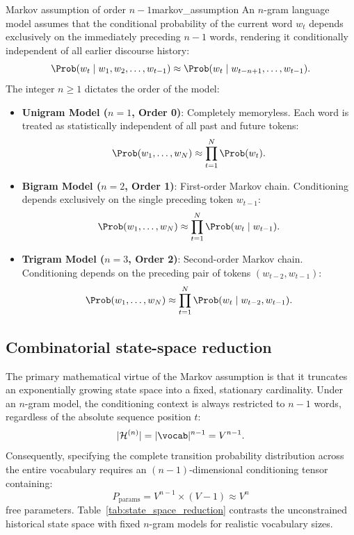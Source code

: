 \documentclass[../../main.tex]{subfiles}
\begin{document}
\begin{definition}{Markov assumption of order $n-1$}{markov_assumption}
An $n$-gram language model assumes that the conditional probability of the current word $w_t$ depends exclusively on the immediately preceding $n-1$ words, rendering it conditionally independent of all earlier discourse history:
\begin{equation}
\label{eq:markov_approx}
\Prob(w_t \mid w_1, w_2, \dots, w_{t-1}) \approx \Prob(w_t \mid w_{t-n+1}, \dots, w_{t-1}).
\end{equation}
The integer $n \ge 1$ dictates the order of the model:
\begin{itemize}
    \item \textbf{Unigram Model ($n=1$, Order 0)}: Completely memoryless. Each word is treated as statistically independent of all past and future tokens:
    \[
    \Prob(w_1, \dots, w_N) \approx \prod_{t=1}^N \Prob(w_t).
    \]
    \item \textbf{Bigram Model ($n=2$, Order 1)}: First-order Markov chain. Conditioning depends exclusively on the single preceding token $w_{t-1}$:
    \[
    \Prob(w_1, \dots, w_N) \approx \prod_{t=1}^N \Prob(w_t \mid w_{t-1}).
    \]
    \item \textbf{Trigram Model ($n=3$, Order 2)}: Second-order Markov chain. Conditioning depends on the preceding pair of tokens $(w_{t-2}, w_{t-1})$:
    \[
    \Prob(w_1, \dots, w_N) \approx \prod_{t=1}^N \Prob(w_t \mid w_{t-2}, w_{t-1}).
    \]
\end{itemize}
\end{definition}

\subsection{Combinatorial state-space reduction}
The primary mathematical virtue of the Markov assumption is that it truncates an exponentially growing state space into a fixed, stationary cardinality. Under an $n$-gram model, the conditioning context is always restricted to $n-1$ words, regardless of the absolute sequence position $t$:
\begin{equation}
\label{eq:state_space_markov}
|\mathcal{H}^{(n)}| = |\vocab|^{n-1} = V^{n-1}.
\end{equation}
Consequently, specifying the complete transition probability distribution across the entire vocabulary requires an $(n-1)$-dimensional conditioning tensor containing:
\begin{equation}
\label{eq:parameters_ngram}
P_{\text{params}} = V^{n-1} \times (V - 1) \approx V^n
\end{equation}
free parameters. Table~\ref{tab:state_space_reduction} contrasts the unconstrained historical state space with fixed $n$-gram models for realistic vocabulary sizes.
\end{document}
